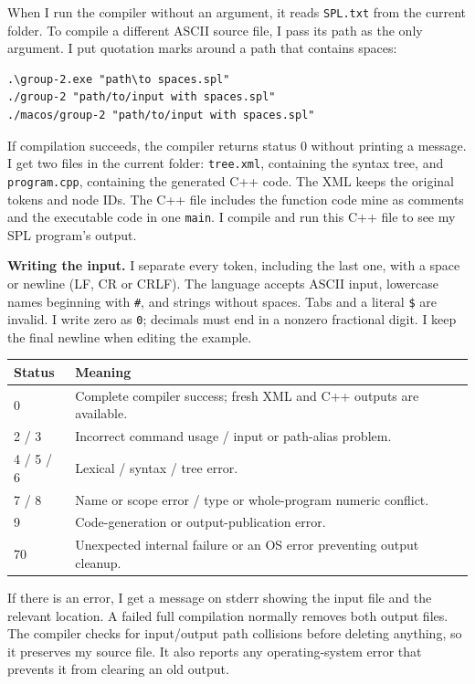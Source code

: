 \documentclass[11pt,a4paper]{article}
\newcommand{\heading}[1]{\vspace{5pt}{\large\bfseries\color{navy}#1}\par}
\begin{document}
\newpage
\heading{5. Input, output and errors}
When I run the compiler without an argument, it reads \texttt{SPL.txt} from the current folder. To compile a different ASCII source file, I pass its path as the only argument. I put quotation marks around a path that contains spaces:
\begin{lstlisting}
.\group-2.exe "path\to spaces.spl"
./group-2 "path/to/input with spaces.spl"
./macos/group-2 "path/to/input with spaces.spl"
\end{lstlisting}
If compilation succeeds, the compiler returns status 0 without printing a message. I get two files in the current folder: \texttt{tree.xml}, containing the syntax tree, and \texttt{program.cpp}, containing the generated C++ code. The XML keeps the original tokens and node IDs. The C++ file includes the function code mine as comments and the executable code in one \texttt{main}. I compile and run this C++ file to see my SPL program's output.

\textbf{Writing the input.} I separate every token, including the last one, with a space or newline (LF, CR or CRLF). The language accepts ASCII input, lowercase names beginning with \texttt{\#}, and strings without spaces. Tabs and a literal \texttt{\$} are invalid. I write zero as \texttt{0}; decimals must end in a nonzero fractional digit. I keep the final newline when editing the example.

\begin{tabular}{@{}p{17mm}p{128mm}@{}}\toprule
Status & Meaning\\\midrule
0 & Complete compiler success; fresh XML and C++ outputs are available.\\
2 / 3 & Incorrect command usage / input or path-alias problem.\\
4 / 5 / 6 & Lexical / syntax / tree error.\\
7 / 8 & Name or scope error / type or whole-program numeric conflict.\\
9 & Code-generation or output-publication error.\\
70 & Unexpected internal failure or an OS error preventing output cleanup.\\\bottomrule
\end{tabular}\par\medskip
If there is an error, I get a message on stderr showing the input file and the relevant location. A failed full compilation normally removes both output files. The compiler checks for input/output path collisions before deleting anything, so it preserves my source file. It also reports any operating-system error that prevents it from clearing an old output.
\end{document}

